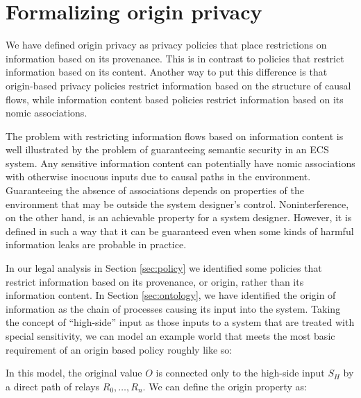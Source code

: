 \documentclass[../thesis.tex]{subfiles}
\begin{document}
\section{Formalizing origin privacy}
\label{sec:robustness}

We have defined origin privacy as privacy policies
that place restrictions on information based on its
provenance.
This is in contrast to policies that restrict information
based on its content.
Another way to put this difference is that origin-based
privacy policies restrict information based on
the structure of causal flows, while information content
based policies restrict information based on its nomic
associations.

The problem with restricting information flows based on
information content is well illustrated by the problem
of guaranteeing semantic security in an ECS system.
Any sensitive information content can potentially
have nomic associations with otherwise inocuous
inputs due to causal paths in the environment.
Guaranteeing the absence of associations depends
on properties of the environment that may be outside
the system designer's control.
Noninterference, on the other hand, is an achievable
property for a system designer.
However, it is defined in such a way that it can be guaranteed
even when some kinds of harmful information leaks are
probable in practice.

In our legal analysis in Section \ref{sec:policy}
we identified some policies that restrict information
based on its provenance, or origin, rather than its information
content.
In Section \ref{sec:ontology}, we have identified the origin
of information as the chain of processes causing its
input into the system.
Taking the concept of ``high-side'' input as those inputs
to a system that are treated with special sensitivity,
we can model an example world that meets the most basic
requirement of an origin based policy roughly like so:

\begin{center}
\end{center}

In this model, the original value $O$ is connected only
to the high-side input $S_H$ by a direct
path of relays $R_0, \ldots, R_n$.
We can define the origin property as:
\end{document}
